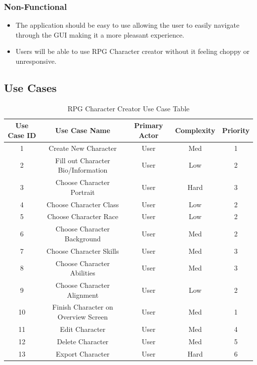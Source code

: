 \documentclass[10pt,conference,onecolumn,compsoc]{IEEEtran}
\begin{document}
\subsubsection{Non-Functional}
\begin{itemize}
\item The application should be easy to use allowing the user to easily navigate through the GUI making it a more pleasant experience.
\item Users will be able to use  RPG Character creator without it feeling choppy or unresponsive.
\end{itemize}

\subsection{Use Cases}
\begin{table}
\centering
\begin{tabular}{|c|c|c|c|c|}
\hline
Use Case ID & Use Case Name & Primary Actor & Complexity & Priority \\
\hline \hline
1 &  Create New Character & User & Med & 1\\
\hline
2 & Fill out Character Bio/Information & User & Low & 2\\
\hline
3 & Choose Character Portrait & User & Hard & 3\\
\hline
4 & Choose Character Class & User & Low & 2\\
\hline
5 & Choose Character Race & User & Low & 2\\
\hline
6 & Choose Character Background & User & Med & 2\\
\hline
7 & Choose Character Skills & User & Med & 3\\
\hline
8 & Choose Character Abilities & User & Med & 3\\
\hline
9 & Choose Character Alignment & User & Low & 2\\
\hline
10 & Finish Character on Overview Screen & User & Med & 1\\
\hline
11 & Edit Character & User & Med & 4\\
\hline
12 & Delete Character & User & Med & 5\\
\hline
13 & Export Character & User & Hard & 6\\
\hline

\end{tabular}
\caption{RPG Character Creator Use Case Table}
\label{tab:useCaseIndex}
\end{table}
\end{document}
